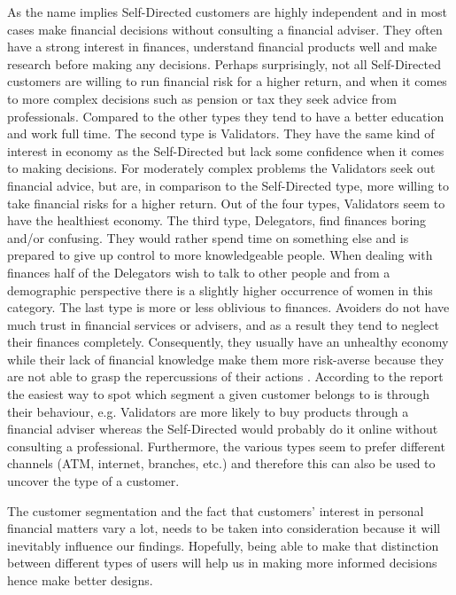 As the name implies Self-Directed customers are highly independent and in most cases make financial decisions without consulting a financial adviser. They often have a strong interest in finances, understand financial products well and make research before making any decisions. Perhaps surprisingly, not all Self-Directed customers are willing to run financial risk for a higher return, and when it comes to more complex decisions such as pension or tax they seek advice from professionals. Compared to the other types they tend to have a better education and work full time. The second type is Validators. They have the same kind of interest in economy as the Self-Directed but lack some confidence when it comes to making decisions. For moderately complex problems the Validators seek out financial advice, but are, in comparison to the Self-Directed type, more willing to take financial risks for a higher return. Out of the four types, Validators seem to have the healthiest economy. The third type, Delegators, find finances boring and/or confusing. They would rather spend time on something else and is prepared to give up control to more knowledgeable people. When dealing with finances half of the Delegators wish to talk to other people and from a demographic perspective there is a slightly higher occurrence of women in this category. The last type is more or less oblivious to finances. Avoiders do not have much trust in financial services or advisers, and as a result they tend to neglect their finances completely. Consequently, they usually have an unhealthy economy while their lack of financial knowledge make them more risk-averse because they are not able to grasp the repercussions of their actions \cite[p.~10-11]{ensor2006segmenting}. According to the report the easiest way to spot which segment a given customer belongs to is through their behaviour, e.g. Validators are more likely to buy products through a financial adviser whereas the Self-Directed would probably do it online without consulting a professional. Furthermore, the various types seem to prefer different channels (ATM, internet, branches, etc.) and therefore this can also be used to uncover the type of a customer.

The customer segmentation and the fact that customers’ interest in personal financial matters vary a lot, needs to be taken into consideration because it will inevitably influence our findings. Hopefully, being able to make that distinction between different types of users will help us in making more informed decisions hence make better designs.
